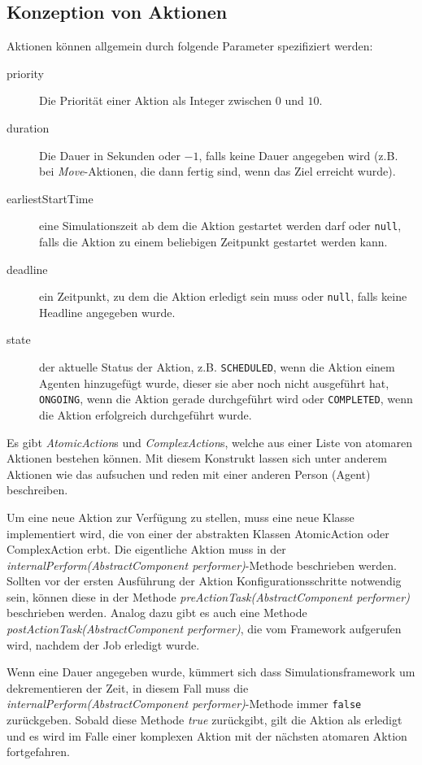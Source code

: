 \subsection{Konzeption von Aktionen}\label{subsec:concept_actions}
Aktionen können allgemein durch folgende Parameter spezifiziert werden:
\begin{description}
	\item[priority] Die Priorität einer Aktion als Integer zwischen $0$ und $10$.
	\item[duration] Die Dauer in Sekunden oder $-1$, falls keine Dauer angegeben wird (z.B. bei \emph{Move}-Aktionen, die dann fertig sind, wenn das Ziel erreicht wurde).
	\item[earliestStartTime] eine Simulationszeit ab dem die Aktion gestartet werden darf oder \texttt{null}, falls die Aktion zu einem beliebigen Zeitpunkt gestartet werden kann.
	\item[deadline] ein Zeitpunkt, zu dem die Aktion erledigt sein muss oder \texttt{null}, falls keine Headline angegeben wurde.
	\item[state] der aktuelle Status der Aktion, z.B. \texttt{SCHEDULED}, wenn die Aktion einem Agenten hinzugefügt wurde, dieser sie aber noch nicht ausgeführt hat, \texttt{ONGOING}, wenn die Aktion gerade durchgeführt wird oder \texttt{COMPLETED}, wenn die Aktion erfolgreich durchgeführt wurde.
\end{description}
Es gibt \emph{AtomicAction}s und \emph{ComplexAction}s, welche aus einer Liste von atomaren Aktionen bestehen können. Mit diesem Konstrukt lassen sich unter anderem Aktionen wie das aufsuchen und reden mit einer anderen Person (Agent) beschreiben.

Um eine neue Aktion zur Verfügung zu stellen, muss eine neue Klasse implementiert wird, die von einer der abstrakten Klassen AtomicAction oder ComplexAction erbt. Die eigentliche Aktion muss in der \emph{internalPerform(AbstractComponent performer)}-Methode beschrieben werden. Sollten vor der ersten Ausführung der Aktion Konfigurationsschritte notwendig sein, können diese in der Methode \emph{preActionTask(AbstractComponent performer)} beschrieben werden. Analog dazu gibt es auch eine Methode \emph{postActionTask(AbstractComponent performer)}, die vom Framework aufgerufen wird, nachdem der Job erledigt wurde.

Wenn eine Dauer angegeben wurde, kümmert sich dass Simulationsframework um dekrementieren der Zeit, in diesem Fall muss die \emph{internalPerform(AbstractComponent performer)}-Methode immer \texttt{false} zurückgeben. Sobald diese Methode \emph{true} zurückgibt, gilt die Aktion als erledigt und es wird im Falle einer komplexen Aktion mit der nächsten atomaren Aktion fortgefahren.

